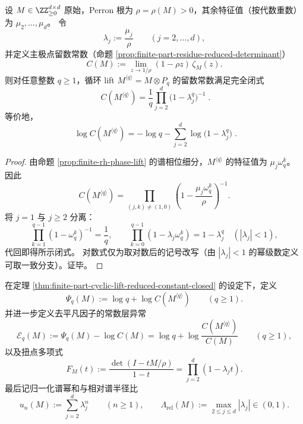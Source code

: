 \begin{theorem}\label{thm:finite-part-cyclic-lift-reduced-constant-closed}
设 \(M\in\ZZ_{\ge 0}^{d\times d}\) 原始，Perron 根为 \(\rho=\rho(M)>0\)，其余特征值（按代数重数）为 \(\mu_2,\dots,\mu_d\)。
令
\[
\lambda_j:=\frac{\mu_j}{\rho}\qquad(j=2,\dots,d),
\]
并定义主极点留数常数（命题 \ref{prop:finite-part-residue-reduced-determinant}）
\[
C(M):=\lim_{z\to 1/\rho}(1-\rho z)\,\zeta_M(z).
\]
则对任意整数 \(q\ge 1\)，循环 lift \(M^{\langle q\rangle}=M\otimes P_q\) 的留数常数满足完全闭式
\[
\boxed{\;
C(M^{\langle q\rangle})
=\frac{1}{q}\prod_{j=2}^{d}\bigl(1-\lambda_j^{q}\bigr)^{-1}\; }.
\]
等价地，
\[
\boxed{\;
\log C(M^{\langle q\rangle})
=-\log q-\sum_{j=2}^{d}\log\!\bigl(1-\lambda_j^{q}\bigr)\; }.
\]
\end{theorem}
\begin{proof}
由命题 \ref{prop:finite-rh-phase-lift} 的谱相位细分，\(M^{\langle q\rangle}\) 的特征值为 \(\mu_j\omega_q^k\)。
因此
\[
C(M^{\langle q\rangle})
=\prod_{(j,k)\neq(1,0)}\left(1-\frac{\mu_j\omega_q^k}{\rho}\right)^{-1}.
\]
将 \(j=1\) 与 \(j\ge 2\) 分离：
\[
\prod_{k=1}^{q-1}(1-\omega_q^k)^{-1}=\frac{1}{q},
\qquad
\prod_{k=0}^{q-1}\left(1-\lambda_j\omega_q^k\right)=1-\lambda_j^{q}\quad(|\lambda_j|<1),
\]
代回即得所示闭式。
对数式仅为取对数后的记号改写（由 \(|\lambda_j|<1\) 的幂级数定义可取一致分支）。证毕。
\end{proof}

\begin{definition}\label{def:finite-part-cyclic-lift-psi}
在定理 \ref{thm:finite-part-cyclic-lift-reduced-constant-closed} 的设定下，定义
\[
\Psi_q(M):=\log q+\log C(M^{\langle q\rangle})\qquad(q\ge 1).
\]
并进一步定义去平凡因子的常数层异常
\[
\mathcal{E}_q(M):=\Psi_q(M)-\log C(M)
=\log q+\log\frac{C(M^{\langle q\rangle})}{C(M)}\qquad(q\ge 1),
\]
以及扭点多项式
\[
F_M(t):=\frac{\det(I-tM/\rho)}{1-t}=\prod_{j=2}^{d}(1-\lambda_j t).
\]
最后记归一化谱幂和与相对谱半径比
\[
u_n(M):=\sum_{j=2}^{d}\lambda_j^{n}\qquad(n\ge 1),
\qquad
\Lambda_{\mathrm{rel}}(M):=\max_{2\le j\le d}|\lambda_j|\in(0,1).
\]
\end{definition}

